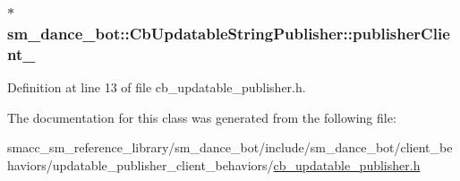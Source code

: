 \subsubsection[{\texorpdfstring{publisher\+Client\+\_\+}{publisherClient_}}]{$\ast$ sm\+\_\+dance\+\_\+bot\+::\+Cb\+Updatable\+String\+Publisher\+::publisher\+Client\+\_\+}\hypertarget{classsm__dance__bot_1_1CbUpdatableStringPublisher_ab14197ec2915c3bb9830e5324ef2be9a}{}\label{classsm__dance__bot_1_1CbUpdatableStringPublisher_ab14197ec2915c3bb9830e5324ef2be9a}


Definition at line 13 of file cb\+\_\+updatable\+\_\+publisher.\+h.



The documentation for this class was generated from the following file\+:\begin{DoxyCompactItemize}
\item 
smacc\+\_\+sm\+\_\+reference\+\_\+library/sm\+\_\+dance\+\_\+bot/include/sm\+\_\+dance\+\_\+bot/client\+\_\+behaviors/updatable\+\_\+publisher\+\_\+client\+\_\+behaviors/\hyperlink{cb__updatable__publisher_8h}{cb\+\_\+updatable\+\_\+publisher.\+h}\end{DoxyCompactItemize}
